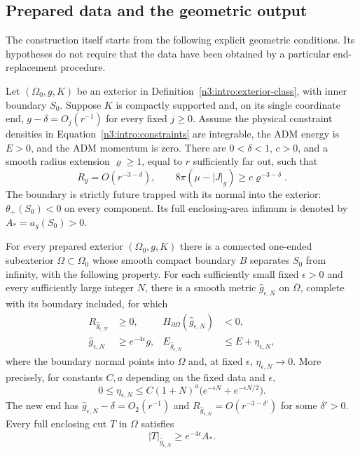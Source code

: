 \subsection{Prepared data and the geometric output}

The construction itself starts from the following explicit geometric
conditions. Its hypotheses do not require that the data have been
obtained by a particular end-replacement procedure.

\begin{definition}\label{n3:prepared:data}
Let $(\Omega_0,g,K)$ be an exterior in
Definition~\ref{n3:intro:exterior-class}, with inner boundary $S_0$.
Suppose $K$ is compactly supported and, on its single coordinate end,
$g-\delta=O_j(r^{-1})$ for every fixed $j\ge0$. Assume the physical
constraint densities in Equation~\eqref{n3:intro:constraints} are
integrable, the ADM energy is $E>0$, and the ADM momentum is zero.
There are $0<\delta<1$, $c>0$, and a smooth radius extension
$\varrho\ge1$, equal to $r$ sufficiently far out, such that
\[
 R_g=O(r^{-3-\delta}),\qquad
 8\pi(\mu-|J|_g)\ge c\varrho^{-3-\delta}.
\]
The boundary is strictly future trapped with its normal into the
exterior: $\theta_+(S_0)<0$ on every component. Its full enclosing-area
infimum is denoted by $A_*=a_g(S_0)>0$.
\end{definition}

\begin{theorem}
\label{n3:prepared:output}
For every prepared exterior $(\Omega_0,g,K)$ there is a connected
one-ended subexterior $\Omega\subset\Omega_0$ whose smooth compact
boundary $B$ separates $S_0$ from infinity, with the following property.
For each sufficiently small fixed $\epsilon>0$ and every sufficiently
large integer $N$, there is a smooth metric $\widehat g_{\epsilon,N}$
on $\overline\Omega$, complete with its boundary included, for which
\begin{align}
 R_{\widehat g_{\epsilon,N}}&\ge0,
 &H_{\partial\Omega}(\widehat g_{\epsilon,N})&<0,
 \label{n3:prepared:curvature}\\
 \widehat g_{\epsilon,N}&\ge e^{-4\epsilon}g,
 &E_{\widehat g_{\epsilon,N}}&\le E+\eta_{\epsilon,N},
 \label{n3:prepared:comparison}
\end{align}
where the boundary normal points into $\Omega$ and, at fixed
$\epsilon$, $\eta_{\epsilon,N}\to0$. More precisely, for constants
$C,a$ depending on the fixed data and $\epsilon$,
\[
 0\le\eta_{\epsilon,N}\le
 C(1+N)^a\bigl(e^{-\epsilon N}+e^{-\epsilon N/2}\bigr).
\]
The new end has $\widehat g_{\epsilon,N}-\delta=O_2(r^{-1})$ and
$R_{\widehat g_{\epsilon,N}}=O(r^{-3-\delta'})$ for some
$\delta'>0$. Every full enclosing cut $T$ in $\Omega$ satisfies
\[
 |T|_{\widehat g_{\epsilon,N}}\ge e^{-4\epsilon}A_*.
\]
\end{theorem}

